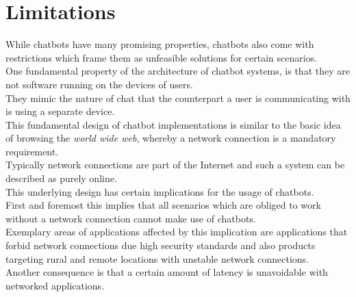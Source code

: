 \section{Limitations}


While chatbots have many promising properties, chatbots also come with restrictions
which frame them as unfeasible solutions for certain scenarios.
\\

One fundamental property of the architecture of chatbot systems,
is that they are not software running on the devices of users.
\\
They mimic the nature of chat that the counterpart a user is communicating with is using a separate device.
\\
This fundamental design of chatbot implementations is similar to the basic
idea of browsing the \emph{world wide web}, whereby a network connection is a mandatory requirement.
\\
Typically network connections are part of the Internet
and such a system can be described as purely online.
\\

This underlying design has certain implications for the usage of chatbots.
\\

First and foremost this implies that all scenarios which are obliged to work without a network connection
cannot make use of chatbots.
\\
Exemplary areas of applications affected by this implication are
applications that forbid network connections due high security standards
and also products targeting rural and remote locations with unstable network connections.
\\

Another consequence is that a certain amount of latency is unavoidable with networked applications.
\\


